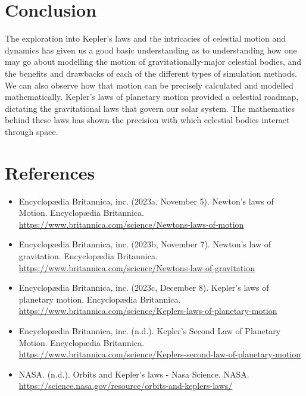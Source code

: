 \documentclass[12pt]{article}
\begin{document}
\begin{spacing}{1.25}
\newpage
\section{Conclusion}
\par {
    The exploration into Kepler's laws and the intricacies of celestial motion and dynamics has given us a good basic understanding as to understanding how one may go about modelling the motion of gravitationally-major celestial bodies, and the benefits and drawbacks of each of the different types of simulation methods. We can also observe how that motion can be precisely calculated and modelled mathematically. Kepler's laws of planetary motion provided a celestial roadmap, dictating the gravitational laws that govern our solar system. The mathematics behind these laws has shown the precision with which celestial bodies interact through space.
}


\newpage
\section{References}
\par {
    \begin{itemize}
        \item Encyclopædia Britannica, inc. (2023a, November 5). Newton’s laws of Motion. 
        Encyclopædia Britannica. \url{https://www.britannica.com/science/Newtons-laws-of-motion} 
        
        \item Encyclopædia Britannica, inc. (2023b, November 7). Newton’s law of gravitation. 
        Encyclopædia Britannica. \url{https://www.britannica.com/science/Newtons-law-of-gravitation}
        
        \item Encyclopædia Britannica, inc. (2023c, December 8). Kepler’s laws of planetary motion. 
        Encyclopædia Britannica. \url{https://www.britannica.com/science/Keplers-laws-of-planetary-motion} 
        
        \item Encyclopædia Britannica, inc. (n.d.). Kepler’s Second Law of Planetary Motion. 
        Encyclopædia Britannica. \url{https://www.britannica.com/science/Keplers-second-law-of-planetary-motion} 
        
        \item NASA. (n.d.). Orbits and Kepler’s laws - Nasa Science. 
        NASA. \url{https://science.nasa.gov/resource/orbits-and-keplers-laws/}
                

\end{itemize}}
\end{spacing}
\end{document}

